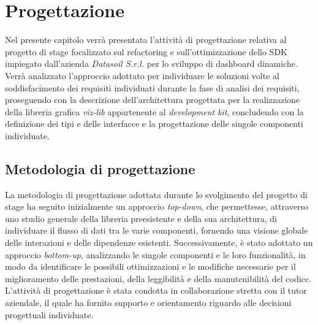\chapter{Progettazione}
\label{chap:progettazione}
Nel presente capitolo verrà presentata l'attività di progettazione relativa al progetto di stage focalizzato sul refactoring e
sull'ottimizzazione dello SDK impiegato dall'azienda \textit{Datasoil S.r.l.} per lo sviluppo di dashboard dinamiche.
Verrà analizzato l'approccio adottato per individuare le soluzioni volte al soddisfacimento dei requisiti individuati durante
la fase di analisi dei requisiti, proseguendo con la descrizione dell'architettura progettata per la realizzazione della libreria grafica \textit{viz-lib}
appartenente al \textit{development kit}, concludendo con la definizione dei tipi e delle interfacce e la progettazione delle singole componenti individuate.

\section{Metodologia di progettazione}
La metodologia di progettazione adottata durante lo svolgimento del progetto di stage ha seguito inizialmente un approccio
\textit{top-down}, che permettesse, attraverso uno studio generale della libreria preesistente e della sua architettura, di individuare
il flusso di dati tra le varie componenti, fornendo una visione globale delle interazioni e delle dipendenze esistenti.
Successivamente, è stato adottato un approccio \textit{bottom-up}, analizzando le singole componenti e le loro funzionalità,
in modo da identificare le possibili ottimizzazioni e le modifiche necessarie per il miglioramento delle prestazioni, della leggibilità e
della manutenibilità del codice.\newline
L'attività di progettazione è stata condotta in collaborazione stretta con il tutor aziendale, il quale ha fornito supporto e orientamento
riguardo alle decisioni progettuali individuate.

